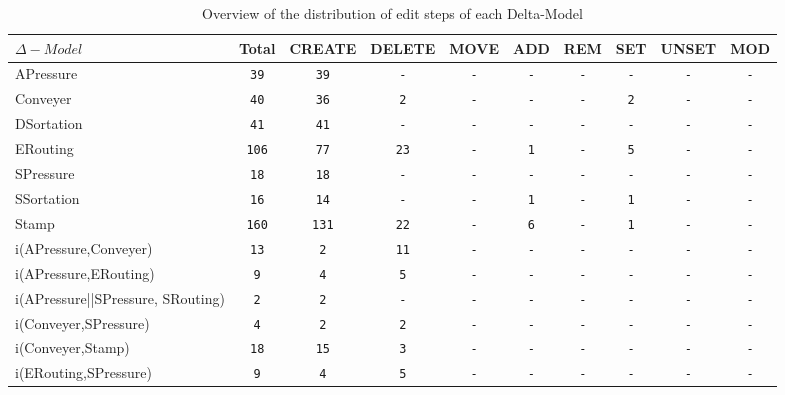 \begin{table} 
 \center 
 \small 
\begin{tabular}{|l|c|c|c|c|c|c|c|c|c|}
\hline
$\Delta-Model$ & Total & CREATE & DELETE & MOVE & ADD & REM & SET & UNSET & MOD\\ 
  \hline 
APressure & \texttt{39} & \texttt{39} & \texttt{-} & \texttt{-} & \texttt{-} & \texttt{-} & \texttt{-} & \texttt{-} & \texttt{-}\\ 
  \hline 
Conveyer & \texttt{40} & \texttt{36} & \texttt{2} & \texttt{-} & \texttt{-} & \texttt{-} & \texttt{2} & \texttt{-} & \texttt{-}\\ 
  \hline 
DSortation & \texttt{41} & \texttt{41} & \texttt{-} & \texttt{-} & \texttt{-} & \texttt{-} & \texttt{-} & \texttt{-} & \texttt{-}\\ 
  \hline 
ERouting & \texttt{106} & \texttt{77} & \texttt{23} & \texttt{-} & \texttt{1} & \texttt{-} & \texttt{5} & \texttt{-} & \texttt{-}\\ 
  \hline 
SPressure & \texttt{18} & \texttt{18} & \texttt{-} & \texttt{-} & \texttt{-} & \texttt{-} & \texttt{-} & \texttt{-} & \texttt{-}\\ 
  \hline 
SSortation & \texttt{16} & \texttt{14} & \texttt{-} & \texttt{-} & \texttt{1} & \texttt{-} & \texttt{1} & \texttt{-} & \texttt{-}\\ 
  \hline 
Stamp & \texttt{160} & \texttt{131} & \texttt{22} & \texttt{-} & \texttt{6} & \texttt{-} & \texttt{1} & \texttt{-} & \texttt{-}\\ 
  \hline 
i(APressure,Conveyer) & \texttt{13} & \texttt{2} & \texttt{11} & \texttt{-} & \texttt{-} & \texttt{-} & \texttt{-} & \texttt{-} & \texttt{-}\\ 
  \hline 
i(APressure,ERouting) & \texttt{9} & \texttt{4} & \texttt{5} & \texttt{-} & \texttt{-} & \texttt{-} & \texttt{-} & \texttt{-} & \texttt{-}\\ 
  \hline 
i(APressure||SPressure, SRouting) & \texttt{2} & \texttt{2} & \texttt{-} & \texttt{-} & \texttt{-} & \texttt{-} & \texttt{-} & \texttt{-} & \texttt{-}\\ 
  \hline 
i(Conveyer,SPressure) & \texttt{4} & \texttt{2} & \texttt{2} & \texttt{-} & \texttt{-} & \texttt{-} & \texttt{-} & \texttt{-} & \texttt{-}\\ 
  \hline 
i(Conveyer,Stamp) & \texttt{18} & \texttt{15} & \texttt{3} & \texttt{-} & \texttt{-} & \texttt{-} & \texttt{-} & \texttt{-} & \texttt{-}\\ 
  \hline 
i(ERouting,SPressure) & \texttt{9} & \texttt{4} & \texttt{5} & \texttt{-} & \texttt{-} & \texttt{-} & \texttt{-} & \texttt{-} & \texttt{-}\\ 
  \hline 
\end{tabular}
\caption[Overview: Delta-Models]{Overview of the distribution of edit steps of each Delta-Model}
\end{table}

